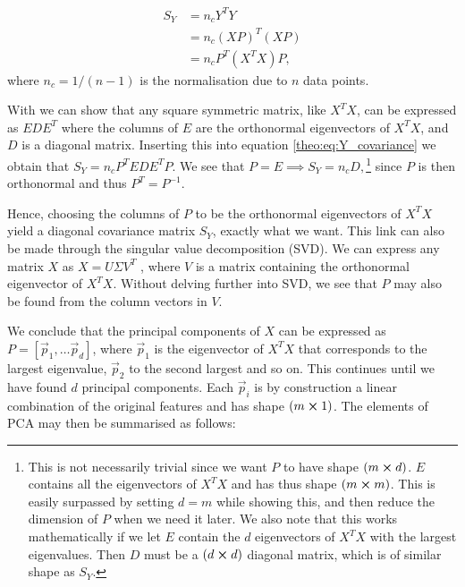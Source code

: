     \begin{align}\label{theo:eq:Y_covariance}
        S_Y &= n_cY^TY\nonumber\\
        &= n_c(XP)^T(XP) \nonumber\\
        &= n_cP^T(X^TX)P,
    \end{align} 
    where $n_c = 1/(n-1)$ is the normalisation due to $n$ data points.

    With \citep[ch. 5.3]{linalgbok} we can show that any square symmetric matrix, like $X^TX$, can be expressed as $EDE^T$ where the columns of $E$ are the orthonormal eigenvectors of $X^TX$, and $D$ is a diagonal matrix. Inserting this into equation  \ref{theo:eq:Y_covariance} we obtain that $S_Y = n_cP^TEDE^TP$. We see that $P=E \implies S_Y=n_c D,$\footnote{This is not necessarily trivial since we want $P$ to have shape $(m\cross d)$. $E$ contains all the eigenvectors of $X^TX$ and has thus shape $(m\cross m)$. This is easily surpassed by setting $d=m$ while showing this, and then reduce the dimension of $P$ when we need it later. We also note that this works mathematically if we let $E$ contain the $d$ eigenvectors of $X^TX$ with the largest eigenvalues. Then $D$ must be a $(d\cross d)$ diagonal matrix, which is of similar shape as $S_Y$.} since $P$ is then orthonormal and thus $P^T=P^{-1}$.
 

    Hence, choosing the columns of $P$ to be the orthonormal eigenvectors of $X^TX$ yield a diagonal covariance matrix $S_Y$, exactly what we want. This link can also be made through the singular value decomposition (SVD). We can express any matrix $X$ as $X=U\Sigma V^T$ \citep[ch. 7.4]{linalgbok}, where $V$ is a matrix containing the orthonormal eigenvector of $X^TX$. Without delving further into SVD, we see that $P$ may also be found from the column vectors in $V$. 
    
    We conclude that the principal components of $X$ can be expressed as $P=[\vec{p}_1, \dots \vec{p}_d]$, where $\vec{p}_1$ is the eigenvector of $X^TX$ that corresponds to the largest eigenvalue, $\vec{p}_2$ to the second largest and so on. This continues until we have found $d$ principal components. Each $\vec{p}_i$ is by construction a linear combination of the original features and has shape $(m\cross 1)$.   The elements of PCA may then be summarised as follows:

